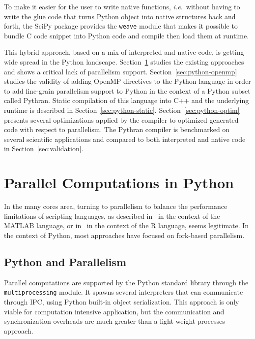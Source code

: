 \documentclass{llncs}
\begin{document}
To make it easier for the user to write native functions, \emph{i.e.}\ without
having to write the glue code that turns Python object into native structures
back and forth, the SciPy package provides the \texttt{weave} module that makes
it possible to bundle C code snippet into Python code and compile then load them
at runtime.

This hybrid approach, based on a mix of interpreted and native code, is getting
wide spread in the Python landscape. Section~\ref{sec:python-parallel} studies the
existing approaches and shows a critical lack of parallelism support.
Section~\ref{sec:python-openmp} studies the validity of adding OpenMP directives to the
Python language in order to add fine-grain parallelism support to Python in the
context of a Python subset called Pythran. Static compilation of this language
into C++ and the underlying runtime is described in
Section~\ref{sec:python-static}.
Section~\ref{sec:python-optim} presents several optimizations applied by the compiler to
optimized generated code with respect to parallelism. The Pythran compiler is
benchmarked on several scientific applications and compared to both interpreted
and native code in Section~\ref{sec:validation}.

\section{Parallel Computations in Python}\label{sec:python-parallel}

In the many cores area, turning to parallelism to balance the performance
limitations of scripting languages, as described in~\cite{choy05} in the context
of the MATLAB language, or in~\cite{mals07} in the context of the R language,
seems legitimate. In the context of Python, most approaches have
focused on fork-based parallelism.

\subsection{Python and Parallelism}

Parallel computations are supported by the Python standard library through the
\texttt{multiprocessing} module. It spawns several interpreters that can
communicate through IPC, using Python built-in object serialization. This
approach is only viable for computation intensive application, but the
communication and synchronization overheads are much greater than a light-weight
processes approach.
\end{document}
